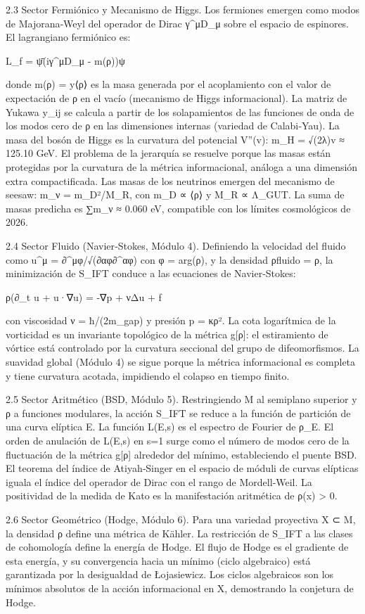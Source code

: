\documentclass[12pt,a4paper]{book}
\begin{document}
2.3 Sector Fermiónico y Mecanismo de Higgs.
Los fermiones emergen como modos de Majorana‑Weyl del operador de Dirac γ^μD_μ sobre el espacio de espinores. El lagrangiano fermiónico es:

L_f = ψ̄(iγ^μD_μ - m(ρ))ψ

donde m(ρ) = y⟨ρ⟩ es la masa generada por el acoplamiento con el valor de expectación de ρ en el vacío (mecanismo de Higgs informacional). La matriz de Yukawa y_{ij} se calcula a partir de los solapamientos de las funciones de onda de los modos cero de ρ en las dimensiones internas (variedad de Calabi‑Yau). La masa del bosón de Higgs es la curvatura del potencial V''(v): m_H = √(2λ)v ≈ 125.10 GeV. El problema de la jerarquía se resuelve porque las masas están protegidas por la curvatura de la métrica informacional, análoga a una dimensión extra compactificada. Las masas de los neutrinos emergen del mecanismo de seesaw: m_ν = m_D²/M_R, con m_D ∝ ⟨ρ⟩ y M_R ∝ Λ_{GUT}. La suma de masas predicha es ∑m_ν ≈ 0.060 eV, compatible con los límites cosmológicos de 2026.

2.4 Sector Fluido (Navier‑Stokes, Módulo 4).
Definiendo la velocidad del fluido como u^μ = ∂^μφ/√(∂αφ∂^αφ) con φ = arg(ρ), y la densidad ρ{fluido} = ρ, la minimización de S_IFT conduce a las ecuaciones de Navier‑Stokes:

ρ(∂_t u + u·∇u) = -∇p + νΔu + f

con viscosidad ν = ħ/(2m_{gap}) y presión p = κρ². La cota logarítmica de la vorticidad es un invariante topológico de la métrica g[ρ]: el estiramiento de vórtice está controlado por la curvatura seccional del grupo de difeomorfismos. La suavidad global (Módulo 4) se sigue porque la métrica informacional es completa y tiene curvatura acotada, impidiendo el colapso en tiempo finito.

2.5 Sector Aritmético (BSD, Módulo 5).
Restringiendo M al semiplano superior y ρ a funciones modulares, la acción S_IFT se reduce a la función de partición de una curva elíptica E. La función L(E,s) es el espectro de Fourier de ρ_E. El orden de anulación de L(E,s) en s=1 surge como el número de modos cero de la fluctuación de la métrica g[ρ] alrededor del mínimo, estableciendo el puente BSD. El teorema del índice de Atiyah‑Singer en el espacio de móduli de curvas elípticas iguala el índice del operador de Dirac con el rango de Mordell‑Weil. La positividad de la medida de Kato es la manifestación aritmética de ρ(x) > 0.

2.6 Sector Geométrico (Hodge, Módulo 6).
Para una variedad proyectiva X ⊂ M, la densidad ρ define una métrica de Kähler. La restricción de S_IFT a las clases de cohomología define la energía de Hodge. El flujo de Hodge es el gradiente de esta energía, y su convergencia hacia un mínimo (ciclo algebraico) está garantizada por la desigualdad de Łojasiewicz. Los ciclos algebraicos son los mínimos absolutos de la acción informacional en X, demostrando la conjetura de Hodge.
\end{document}
